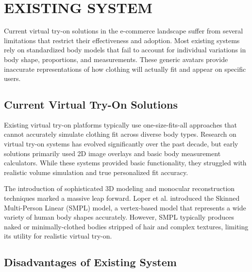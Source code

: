 \documentclass[12pt,a4paper,oneside]{report}
\begin{document}
\chapter{EXISTING SYSTEM}

Current virtual try-on solutions in the e-commerce landscape suffer from several limitations that restrict their effectiveness and adoption. Most existing systems rely on standardized body models that fail to account for individual variations in body shape, proportions, and measurements. These generic avatars provide inaccurate representations of how clothing will actually fit and appear on specific users.

\section{Current Virtual Try-On Solutions}

Existing virtual try-on platforms typically use one-size-fits-all approaches that cannot accurately simulate clothing fit across diverse body types. Research on virtual try-on systems has evolved significantly over the past decade, but early solutions primarily used 2D image overlays and basic body measurement calculators. While these systems provided basic functionality, they struggled with realistic volume simulation and true personalized fit accuracy.

The introduction of sophisticated 3D modeling and monocular reconstruction techniques marked a massive leap forward. Loper et al. introduced the Skinned Multi-Person Linear (SMPL) model, a vertex-based model that represents a wide variety of human body shapes accurately. However, SMPL typically produces naked or minimally-clothed bodies stripped of hair and complex textures, limiting its utility for realistic virtual try-on.

\section{Disadvantages of Existing System}
\end{document}
